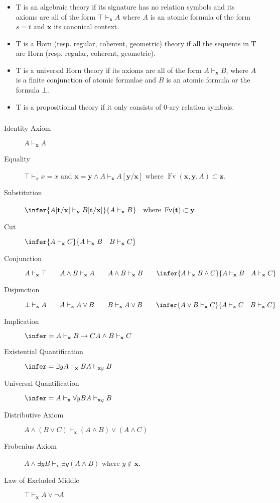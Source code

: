 \documentclass[UTF8,aspectratio=43,11pt,colorlinks,compress,openany]{beamer}%
\begin{document}
\begin{frame}\frametitle{}
\begin{itemize}
	\item $\mathrm{T}$ is an algebraic theory if its signature has no relation symbols and its axioms are all of the form $\top\vdash_{\mathbf{x}}A$ where $A$ is an atomic formula of the form $s=t$ and $\mathbf{x}$ its canonical context.
	\item $\mathrm{T}$ is a Horn (resp. regular, coherent, geometric) theory if all the sequents in $\mathrm{T}$ are Horn (resp. regular, coherent, geometric).
	\item $\mathrm{T}$ is a universal Horn theory if its axioms are all of the form $A\vdash_{\mathbf{x}}B$, where $A$ is a finite conjunction of atomic formulae and $B$ is an atomic formula or the formula $\bot$.
	\item $\mathrm{T}$ is a propositional theory if it only consists of $0$-ary relation symbols.
\end{itemize}
\end{frame}

\begin{frame}\frametitle{}
\begin{description}
	\item[Identity Axiom] $A\vdash_{\mathbf{x}}A$
	\item[Equality] $\top\vdash_x x=x$\;\; and\;\; $\mathbf{x}=\mathbf{y}\wedge A\vdash_{\mathbf{z}}A[\mathbf{y}/\mathbf{x}]$ where $\operatorname{Fv}(\mathbf{x},\mathbf{y},A)\subset\mathbf{z}$.
	\item[Substitution] $\infer{A[\mathbf{t}/\mathbf{x}]\vdash_{\mathbf{y}}B[\mathbf{t}/\mathbf{x}]}{A\vdash_{\mathbf{x}}B}\quad\mbox{where } \operatorname{Fv}(\mathbf{t})\subset\mathbf{y}$.
	\item[Cut] $\infer{A\vdash_{\mathbf{x}}C}{A\vdash_{\mathbf{x}}B\quad B\vdash_{\mathbf{x}}C}$
	\item[Conjunction] $A\vdash_{\mathbf{x}}\top\qquad A\wedge B\vdash_{\mathbf{x}}A\qquad A\wedge B\vdash_{\mathbf{x}}B\qquad\infer{A\vdash_{\mathbf{x}}B\wedge C}{A\vdash_{\mathbf{x}}B\quad A\vdash_{\mathbf{x}}C}$
	\item[Disjunction] $\bot\vdash_{\mathbf{x}}A\qquad A\vdash_{\mathbf{x}}A\vee B\qquad B\vdash_{\mathbf{x}}A\vee B\qquad\infer{A\vee B\vdash_{\mathbf{x}} C}{A\vdash_{\mathbf{x}} C\quad B\vdash_{\mathbf{x}} C}$
	\item[Implication] $\infer={A\vdash_{\mathbf{x}}B\to C}{A\wedge B\vdash_{\mathbf{x}}C}$
	\item[Existential Quantification] $\infer={\exists yA\vdash_{\mathbf{x}}B}{A\vdash_{\mathbf{x}y}B}$
	\item[Universal Quantification] $\infer={A\vdash_{\mathbf{x}}\forall yB}{A\vdash_{\mathbf{x}y}B}$
	\item[Distributive Axiom] $A\wedge(B\vee C)\vdash_{\mathbf{x}}(A\wedge B)\vee(A\wedge C)$
	\item[Frobenius Axiom] $A\wedge\exists yB\vdash_{\mathbf{x}} \exists y(A\wedge B)$ where $y\notin\mathbf{x}$.
	\item[Law of Excluded Middle] $\top\vdash_{\mathbf{x}}A\vee\neg A$
\end{description}
\end{frame}
\end{document}
